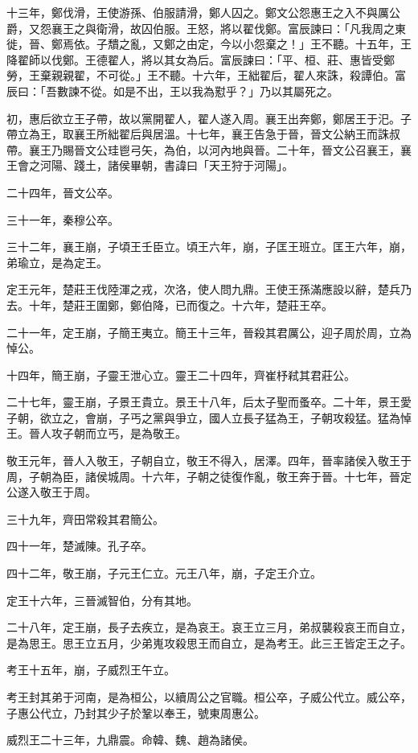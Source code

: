 \begin{pinyinscope}
十三年，鄭伐滑，王使游孫、伯服請滑，鄭人囚之。鄭文公怨惠王之入不與厲公爵，又怨襄王之與衛滑，故囚伯服。王怒，將以翟伐鄭。富辰諫曰：「凡我周之東徙，晉、鄭焉依。子穨之亂，又鄭之由定，今以小怨棄之！」王不聽。十五年，王降翟師以伐鄭。王德翟人，將以其女為后。富辰諫曰：「平、桓、莊、惠皆受鄭勞，王棄親親翟，不可從。」王不聽。十六年，王絀翟后，翟人來誅，殺譚伯。富辰曰：「吾數諫不從。如是不出，王以我為懟乎？」乃以其屬死之。

初，惠后欲立王子帶，故以黨開翟人，翟人遂入周。襄王出奔鄭，鄭居王于汜。子帶立為王，取襄王所絀翟后與居溫。十七年，襄王告急于晉，晉文公納王而誅叔帶。襄王乃賜晉文公珪鬯弓矢，為伯，以河內地與晉。二十年，晉文公召襄王，襄王會之河陽、踐土，諸侯畢朝，書諱曰「天王狩于河陽」。

二十四年，晉文公卒。

三十一年，秦穆公卒。

三十二年，襄王崩，子頃王壬臣立。頃王六年，崩，子匡王班立。匡王六年，崩，弟瑜立，是為定王。

定王元年，楚莊王伐陸渾之戎，次洛，使人問九鼎。王使王孫滿應設以辭，楚兵乃去。十年，楚莊王圍鄭，鄭伯降，已而復之。十六年，楚莊王卒。

二十一年，定王崩，子簡王夷立。簡王十三年，晉殺其君厲公，迎子周於周，立為悼公。

十四年，簡王崩，子靈王泄心立。靈王二十四年，齊崔杼弒其君莊公。

二十七年，靈王崩，子景王貴立。景王十八年，后太子聖而蚤卒。二十年，景王愛子朝，欲立之，會崩，子丐之黨與爭立，國人立長子猛為王，子朝攻殺猛。猛為悼王。晉人攻子朝而立丐，是為敬王。

敬王元年，晉人入敬王，子朝自立，敬王不得入，居澤。四年，晉率諸侯入敬王于周，子朝為臣，諸侯城周。十六年，子朝之徒復作亂，敬王奔于晉。十七年，晉定公遂入敬王于周。

三十九年，齊田常殺其君簡公。

四十一年，楚滅陳。孔子卒。

四十二年，敬王崩，子元王仁立。元王八年，崩，子定王介立。

定王十六年，三晉滅智伯，分有其地。

二十八年，定王崩，長子去疾立，是為哀王。哀王立三月，弟叔襲殺哀王而自立，是為思王。思王立五月，少弟嵬攻殺思王而自立，是為考王。此三王皆定王之子。

考王十五年，崩，子威烈王午立。

考王封其弟于河南，是為桓公，以續周公之官職。桓公卒，子威公代立。威公卒，子惠公代立，乃封其少子於鞏以奉王，號東周惠公。

威烈王二十三年，九鼎震。命韓、魏、趙為諸侯。


\end{pinyinscope}

